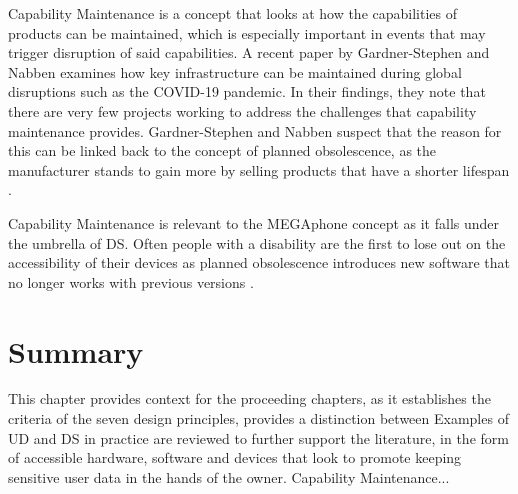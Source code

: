 Capability Maintenance is a concept that looks at how the capabilities of products can be maintained, which is especially important in events that may trigger disruption of said capabilities.
A recent paper by Gardner-Stephen and Nabben \cite{capability} examines how key infrastructure can be maintained during global disruptions such as the COVID-19 pandemic.
In their findings, they note that there are very few projects working to address the challenges that capability maintenance provides.
Gardner-Stephen and Nabben suspect that the reason for this can be linked back to the concept of planned obsolescence, as the manufacturer stands to gain more by selling products that have a shorter lifespan \cite{obsolescence2}.

Capability Maintenance is relevant to the MEGAphone concept as it falls under the umbrella of DS.
Often people with a disability are the first to lose out on the accessibility of their devices as planned obsolescence introduces new software that no longer works with previous versions \cite{obsolescence2}. %


\section{Summary}
This chapter provides context for the proceeding chapters, as it establishes the criteria of the seven design principles, provides a distinction between 
Examples of UD and DS in practice are reviewed to further support the literature, in the form of accessible hardware, software and devices that look to promote keeping sensitive user data in the hands of the owner.
Capability Maintenance...
